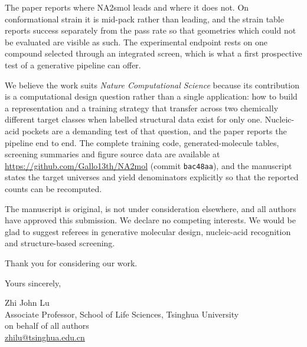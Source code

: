\documentclass[10pt]{article}
\begin{document}
The paper reports where NA2smol leads and where it does not. On conformational strain it is
mid-pack rather than leading, and the strain table reports success separately from the pass rate
so that geometries which could not be evaluated are visible as such. The experimental endpoint
rests on one compound selected through an integrated screen, which is what a first prospective
test of a generative pipeline can offer.

We believe the work suits \emph{Nature Computational Science} because its contribution is a
computational design question rather than a single application: how to build a representation and
a training strategy that transfer across two chemically different target classes when labelled
structural data exist for only one. Nucleic-acid pockets are a demanding test of that question,
and the paper reports the pipeline end to end. The complete training code, generated-molecule
tables, screening summaries and figure source data are available at
\url{https://github.com/Gallo13th/NA2mol} (commit \texttt{bac48aa}), and the manuscript states
the target universes and yield denominators explicitly so that the reported counts can be
recomputed.

The manuscript is original, is not under consideration elsewhere, and all authors have approved
this submission. We declare no competing interests. We would be glad to suggest referees in
generative molecular design, nucleic-acid recognition and structure-based screening.

Thank you for considering our work.

\vspace{0.8em}
Yours sincerely,

\vspace{1.4em}
Zhi John Lu\\
Associate Professor, School of Life Sciences, Tsinghua University\\
on behalf of all authors\\
\href{mailto:zhilu@tsinghua.edu.cn}{zhilu@tsinghua.edu.cn}
\end{document}
